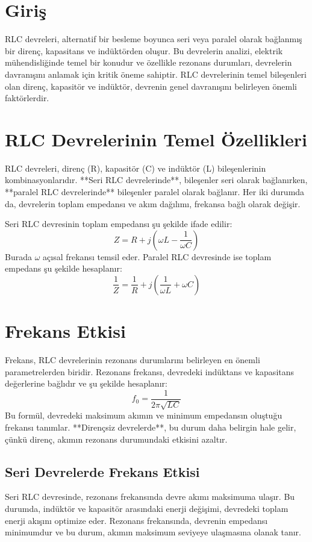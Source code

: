 \documentclass[11pt,letterpaper,twocolumn]{article}
\begin{document}
\section{Giriş}
RLC devreleri, alternatif bir besleme boyunca seri veya paralel olarak bağlanmış bir direnç, kapasitans ve indüktörden oluşur. Bu devrelerin analizi, elektrik mühendisliğinde temel bir konudur ve özellikle rezonans durumları, devrelerin davranışını anlamak için kritik öneme sahiptir. RLC devrelerinin temel bileşenleri olan direnç, kapasitör ve indüktör, devrenin genel davranışını belirleyen önemli faktörlerdir.

\section{RLC Devrelerinin Temel Özellikleri}
RLC devreleri, direnç (R), kapasitör (C) ve indüktör (L) bileşenlerinin kombinasyonlarıdır. **Seri RLC devrelerinde**, bileşenler seri olarak bağlanırken, **paralel RLC devrelerinde** bileşenler paralel olarak bağlanır. Her iki durumda da, devrelerin toplam empedansı ve akım dağılımı, frekansa bağlı olarak değişir. 

Seri RLC devresinin toplam empedansı şu şekilde ifade edilir:
\begin{equation}
Z = R + j\left(\omega L - \frac{1}{\omega C}\right)
\end{equation}
Burada \( \omega \) açısal frekansı temsil eder. Paralel RLC devresinde ise toplam empedans şu şekilde hesaplanır:
\begin{equation}
\frac{1}{Z} = \frac{1}{R} + j\left(\frac{1}{\omega L} + \omega C\right)
\end{equation}

\section{Frekans Etkisi}
Frekans, RLC devrelerinin rezonans durumlarını belirleyen en önemli parametrelerden biridir. Rezonans frekansı, devredeki indüktans ve kapasitans değerlerine bağlıdır ve şu şekilde hesaplanır:
\begin{equation}
f_0 = \frac{1}{2\pi\sqrt{LC}}
\end{equation}
Bu formül, devredeki maksimum akımın ve minimum empedansın oluştuğu frekansı tanımlar. **Dirençsiz devrelerde**, bu durum daha belirgin hale gelir, çünkü direnç, akımın rezonans durumundaki etkisini azaltır.

\subsection{Seri Devrelerde Frekans Etkisi}
Seri RLC devresinde, rezonans frekansında devre akımı maksimuma ulaşır. Bu durumda, indüktör ve kapasitör arasındaki enerji değişimi, devredeki toplam enerji akışını optimize eder. Rezonans frekansında, devrenin empedansı minimumdur ve bu durum, akımın maksimum seviyeye ulaşmasına olanak tanır.
\end{document}

